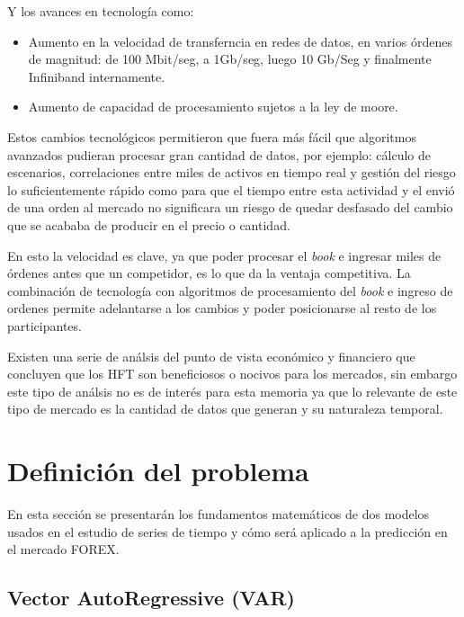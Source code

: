 Y los avances en tecnología como:
\begin{itemize}
 \item Aumento en la velocidad de transferncia en redes de datos, en varios
órdenes de magnitud: de 100 Mbit/seg, a 1Gb/seg, luego 10 Gb/Seg y finalmente
Infiniband internamente.
 \item Aumento de capacidad de procesamiento sujetos a la ley de moore.
\end{itemize}

Estos cambios tecnológicos permitieron que fuera más fácil que algoritmos
avanzados pudieran procesar gran cantidad de datos, por ejemplo: cálculo de
escenarios, correlaciones entre miles de activos en tiempo real y gestión del
riesgo lo suficientemente rápido como para que el tiempo entre esta actividad y
el envió de una orden al mercado no significara un riesgo de quedar desfasado
del cambio que se acababa de producir en el precio o cantidad.


En esto la velocidad es clave, ya que poder procesar el \emph{book} e ingresar
miles de órdenes antes que un competidor, es lo que da la ventaja competitiva.
La combinación de tecnología con algoritmos de procesamiento del \emph{book} e
ingreso de ordenes permite adelantarse a los cambios y poder posicionarse al
resto de los participantes. 
 
Existen una serie de análsis del punto de vista económico y financiero que
concluyen que los HFT son beneficiosos o nocivos para los mercados, sin embargo
este tipo de análsis no es de interés para esta memoria ya que lo relevante de
este tipo de mercado es la cantidad de datos que generan y su naturaleza
temporal.


\section{Definición del problema}

En esta sección se presentarán los fundamentos matemáticos de dos modelos
usados en el estudio de series de tiempo y cómo será aplicado a la predicción
en el mercado FOREX.

\subsection{Vector AutoRegressive (VAR)}

